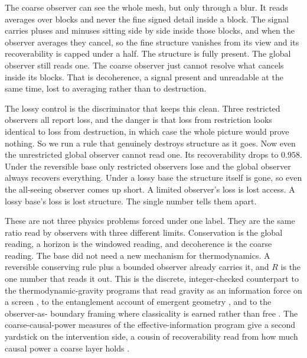 The coarse observer can see the whole mesh, but only through a blur. It reads
averages over blocks and never the fine signed detail inside a block. The signal
carries pluses and minuses sitting side by side inside those blocks, and when the
observer averages they cancel, so the fine structure vanishes from its view and
its recoverability is capped under a half. The structure is fully present. The
global observer still reads one. The coarse observer just cannot resolve what
cancels inside its blocks. That is decoherence, a signal present and unreadable at
the same time, lost to averaging rather than to destruction.

The lossy control is the discriminator that keeps this clean. Three restricted
observers all report loss, and the danger is that loss from restriction looks
identical to loss from destruction, in which case the whole picture would prove
nothing. So we run a rule that genuinely destroys structure as it goes. Now even
the unrestricted global observer cannot read one. Its recoverability drops to
$0.958$. Under the reversible base only restricted observers lose and the global
observer always recovers everything. Under a lossy base the structure itself is
gone, so even the all-seeing observer comes up short. A limited observer's loss is
lost access. A lossy base's loss is lost structure. The single number tells them
apart.

These are not three physics problems forced under one label. They are the same
ratio read by observers with three different limits. Conservation is the global
reading, a horizon is the windowed reading, and decoherence is the coarse
reading. The base did not need a new mechanism for thermodynamics. A reversible
conserving rule plus a bounded observer already carries it, and $R$ is the one
number that reads it out. This is the discrete, integer-checked counterpart to
the thermodynamic-gravity programs that read gravity as an information force on a
screen \cite{jacobson1995, padmanabhan2010, verlinde2011}, to the entanglement
account of emergent geometry \cite{vanraamsdonk2010}, and to the observer-as-
boundary framing where classicality is earned rather than free
\cite{fields2018}. The coarse-causal-power measures of the effective-information
program \cite{hoel2013} give a second yardstick on the intervention side, a
cousin of recoverability read from how much causal power a coarse layer holds
\cite{cluesurf2026repo}.
